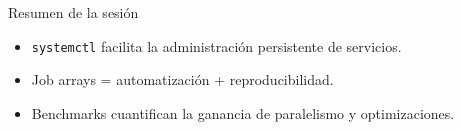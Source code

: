 \documentclass[aspectratio=169,professionalfonts]{beamer}
\begin{document}
\begin{frame}[fragile]{Resumen de la sesión}
  \begin{itemize}
    \item \texttt{systemctl} facilita la administración persistente de servicios.
    \item Job arrays = automatización + reproducibilidad.
    \item Benchmarks cuantifican la ganancia de paralelismo y optimizaciones.
  \end{itemize}
\end{frame}
\end{document}
